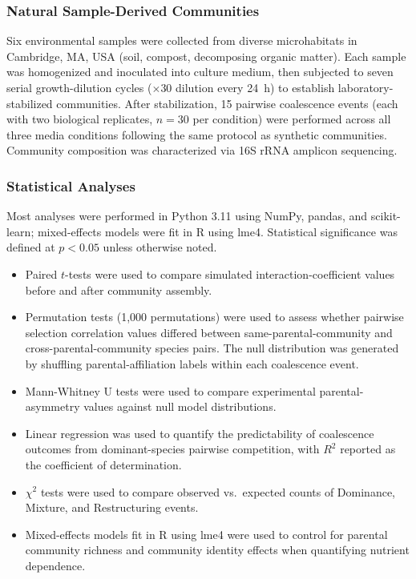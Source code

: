 \subsubsection*{Natural Sample-Derived Communities}
\label{sec:suppl:natural}

Six environmental samples were collected from diverse microhabitats in Cambridge, MA, USA (soil, compost, decomposing organic matter). Each sample was homogenized and inoculated into culture medium, then subjected to seven serial growth-dilution cycles ($\times$30 dilution every 24~h) to establish laboratory-stabilized communities. After stabilization, 15 pairwise coalescence events (each with two biological replicates, $n = 30$ per condition) were performed across all three media conditions following the same protocol as synthetic communities. Community composition was characterized via 16S rRNA amplicon sequencing.


\subsubsection*{Statistical Analyses}
\label{sec:suppl:statistics}

Most analyses were performed in Python 3.11 using NumPy, pandas, and scikit-learn; mixed-effects models were fit in R using lme4. Statistical significance was defined at $p < 0.05$ unless otherwise noted. 

\begin{itemize}
    \item Paired $t$-tests were used to compare simulated interaction-coefficient values before and after community assembly.
    \item Permutation tests (1,000 permutations) were used to assess whether pairwise selection correlation values differed between same-parental-community and cross-parental-community species pairs. The null distribution was generated by shuffling parental-affiliation labels within each coalescence event.
    \item Mann-Whitney U tests were used to compare experimental parental-asymmetry values against null model distributions.
    \item Linear regression was used to quantify the predictability of coalescence outcomes from dominant-species pairwise competition, with $R^2$ reported as the coefficient of determination.
    \item $\chi^2$ tests were used to compare observed vs.\ expected counts of Dominance, Mixture, and Restructuring events.
    \item Mixed-effects models fit in R using lme4 were used to control for parental community richness and community identity effects when quantifying nutrient dependence.
\end{itemize}

